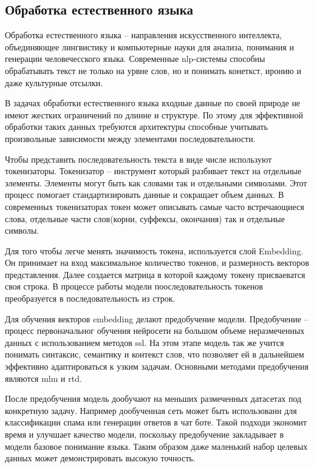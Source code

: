 \documentclass[../part_1.tex]{subfiles}
\begin{document}
\subsection{Обработка естественного языка}
\par Обработка естественного языка -- направления искусственного интеллекта, объединяющее лингвистику и компьютерные науки для анализа, понимания и генерации человечесского языка. Современные \acrshort{nlp}-системы способны обрабатывать текст не только на урвне слов, но и понимать конеткст, иронию и даже культурные отсылки.
\par В задачах обработки естественного языка входные данные по своей природе не имеют жестких ограничений по длинне и структуре. По этому для эффективной обработки таких данных требуются архитектуры способные учитывать произвольные зависимости между элементами последовательности. 
\par Чтобы представить последовательность текста в виде числе используют токенизаторы. Токенизатор -- инструмент который разбивает текст на отдельные элементы. Элементы могут быть как словами так и отдельными символами. Этот процесс помогает стандартизировать данные и сокращает объем данных. В современных токенизаторах токен может описывать самые часто встречающиеся слова, отдельные части слов(корни, суффексы, окончания) так и отдельные символы. 
\par Для того чтобы легче менять значимость токена, используется слой Embedding. Он принимает на вход максимальное количество токенов, и размерность векторов представления. Далее создается матрица в которой каждому токену присваеватся своя строка. В процессе работы модели пооследовательность токенов преобразуется в последовательность из строк.
\par Для обучения векторов embedding делают предобучение модели. Предобучение -- процесс первоначальног обучения нейросети на большом объеме неразмеченных данных с использованием методов \acrfull{ssl}. На этом этапе модель так же учится понимать синтаксис, семантику и контекст слов, что позволяет ей в дальнейшем эффективно адаптироваться к узким задачам. Основными методами предобучения являются \acrshort{mlm}\cite{sinha2021maskedlanguagemodelingdistributional} и \acrshort{rtd}.
\par После предобучения модель дообучают на меньших размеченных датасетах под конкретную задачу. Например дообученная сеть может быть использованн для классификации спама или генерации ответов в чат боте. Такой подходи экономит время и улучшает качество модели, поскольку предобучение закладывает в модели базовое понимание языка. Таким образом даже маленький набор целевых данных может демонстрировать высокую точность.
\end{document}
